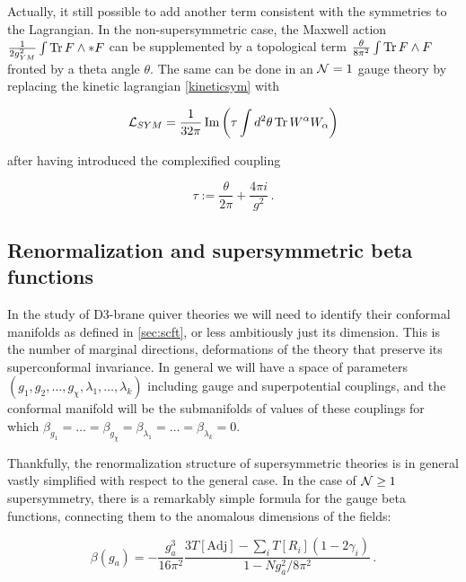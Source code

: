 Actually, it still possible to add another term consistent with the symmetries to the Lagrangian. In the non-supersymmetric case, the Maxwell action $\frac{1}{2g_{YM}^2} \int \operatorname{Tr} F \wedge \ast F$ can be supplemented by a topological term $\frac{\theta}{8\pi^2} \int \operatorname{Tr} F \wedge F$ fronted by a theta angle $\theta$. The same can be done in an $\mathcal{N} = 1$ gauge theory by replacing the kinetic lagrangian \eqref{kineticsym} with

\begin{equation}
	\mathcal{L}_{SYM} = \frac{1}{32\pi} \operatorname{Im} \left( \tau \int d^2 \theta \operatorname{Tr} W^\alpha W_\alpha \right)
	\label{kineticsymtau}
\end{equation}

after having introduced the complexified coupling

\begin{equation}
	\tau := \frac{\theta}{2\pi} + \frac{4\pi i}{g^2}\,.
	\label{complexcoupling}
\end{equation}

\subsection{Renormalization and supersymmetric beta functions}

In the study of D3-brane quiver theories we will need to identify their conformal manifolds as defined in \ref{sec:scft}, or less ambitiously just its dimension. This is the number of marginal directions, deformations of the theory that preserve its superconformal invariance. In general we will have a space of parameters $(g_1, g_2, \ldots, g_\chi, \lambda_1, \ldots, \lambda_k)$ including gauge and superpotential couplings, and the conformal manifold will be the submanifolds of values of these couplings for which $\beta_{g_1} = \ldots = \beta_{g_\chi} = \beta_{\lambda_1} = \ldots = \beta_{\lambda_k} = 0$.

Thankfully, the renormalization structure of supersymmetric theories is in general vastly simplified with respect to the general case. In the case of $\mathcal{N} \geq 1$ supersymmetry, there is a remarkably simple formula for the gauge beta functions, connecting them to the anomalous dimensions of the fields:

\begin{equation}
	\beta(g_a) = - \frac{g_a^3}{16\pi^2} \frac{3 T[\mathrm{Adj}] - \sum_i T[R_i] (1- 2\gamma_i) }{1-Ng_a^2 / 8\pi^2 }\,.
	\label{NSVZ}
\end{equation}


